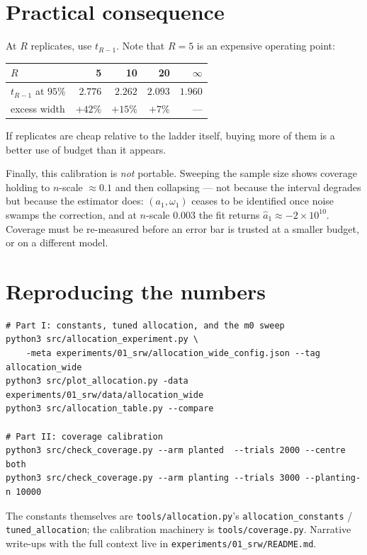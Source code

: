 \documentclass[11pt]{article}
\begin{document}
\section{Practical consequence}

At $R$ replicates, use $t_{R-1}$. Note that $R=5$ is an expensive operating
point:
\begin{center}
\begin{tabular}{lrrrr}
\toprule
$R$ & 5 & 10 & 20 & $\infty$\\
\midrule
$t_{R-1}$ at $95\%$ & $2.776$ & $2.262$ & $2.093$ & $1.960$\\
excess width & $+42\%$ & $+15\%$ & $+7\%$ & --- \\
\bottomrule
\end{tabular}
\end{center}
\noindent
If replicates are cheap relative to the ladder itself, buying more of them is a
better use of budget than it appears.

Finally, this calibration is \emph{not} portable. Sweeping the sample size
shows coverage holding to $n$-scale $\approx 0.1$ and then collapsing --- not
because the interval degrades but because the estimator does: $(a_1,\omega_1)$
ceases to be identified once noise swamps the correction, and at $n$-scale
$0.003$ the fit returns $\hat a_1\approx-2\times10^{10}$. Coverage must be
re-measured before an error bar is trusted at a smaller budget, or on a
different model.

\appendix
\section{Reproducing the numbers}

\begin{verbatim}
# Part I: constants, tuned allocation, and the m0 sweep
python3 src/allocation_experiment.py \
    -meta experiments/01_srw/allocation_wide_config.json --tag allocation_wide
python3 src/plot_allocation.py -data experiments/01_srw/data/allocation_wide
python3 src/allocation_table.py --compare

# Part II: coverage calibration
python3 src/check_coverage.py --arm planted  --trials 2000 --centre both
python3 src/check_coverage.py --arm planting --trials 3000 --planting-n 10000
\end{verbatim}

\noindent
The constants themselves are \texttt{tools/allocation.py}'s
\texttt{allocation\_constants} / \texttt{tuned\_allocation}; the calibration
machinery is \texttt{tools/coverage.py}. Narrative write-ups with the full
context live in \texttt{experiments/01\_srw/README.md}.
\end{document}
